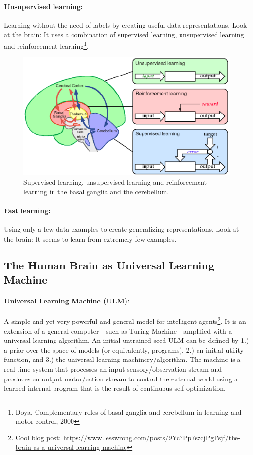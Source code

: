 \documentclass[main]{subfiles}
\begin{document}
\paragraph{Unsupervised learning:}
Learning without the need of labels by creating useful data representations. Look at the brain: It uses a combination of supervised learning, unsupervised learning and reinforcement learning\footnote{Doya, Complementary roles of basal ganglia and cerebellum in learning and motor control, 2000}.
\begin{figure}[h]
    \centering
    \includegraphics[width=0.5\linewidth]{01_Introduction/figures/basalandcerebellum.png}
    \caption{Supervised learning, unsupervised learning and reinforcement learning in the basal ganglia and the cerebellum.}
    \label{fig:basalandcerebellum}
\end{figure}


\paragraph{Fast learning:} 
Using only a few data examples to create generalizing representations. Look at the brain: It seems to learn from extremely few examples.

\subsection{The Human Brain as Universal Learning Machine}

\paragraph{Universal Learning Machine (ULM):} A simple and yet very powerful and general model for intelligent agents\footnote{Cool blog post: \url{https://www.lesswrong.com/posts/9Yc7Pp7szcjPgPsjf/the-brain-as-a-universal-learning-machine}}. It is an extension of a general computer - such as Turing Machine - amplified with a universal learning algorithm. An initial untrained seed ULM can be defined by 1.) a prior over the space of models (or equivalently, programs), 2.) an initial utility function, and 3.) the universal learning machinery/algorithm.  The machine is a real-time system that processes an input sensory/observation stream and produces an output motor/action stream to control the external world using a learned internal program that is the result of continuous self-optimization. 
\end{document}
